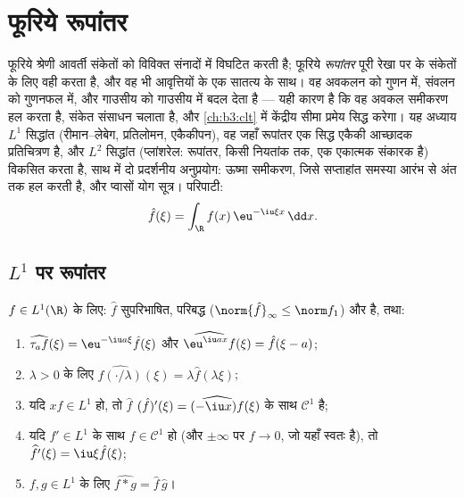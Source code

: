 \chapter{फूरिये रूपांतर}\label{ch:b3:fouriertransform}

फूरिये श्रेणी आवर्ती संकेतों को विविक्त संनादों में विघटित करती
है; फूरिये \emph{रूपांतर} पूरी रेखा पर के संकेतों के लिए वही करता
है, और वह भी आवृत्तियों के एक सातत्य के साथ। वह अवकलन को गुणन में,
संवलन को गुणनफल में, और गाउसीय को गाउसीय में बदल देता है --- यही
कारण है कि वह अवकल समीकरण हल करता है, संकेत संसाधन चलाता है, और
\cref{ch:b3:clt} में केंद्रीय सीमा प्रमेय सिद्ध करेगा। यह अध्याय $L^1$ सिद्धांत
(रीमान--लेबेग, प्रतिलोमन, एकैकीपन), वह  जहाँ रूपांतर
एक सिद्ध एकैकी आच्छादक प्रतिचित्रण है, और $L^2$ सिद्धांत (प्लांशरेल:
रूपांतर, किसी नियतांक तक, एक एकात्मक संकारक है) विकसित करता है,
साथ में दो प्रदर्शनीय अनुप्रयोग: ऊष्मा समीकरण, जिसे सप्ताहांत
समस्या आरंभ से अंत तक हल करती है, और प्वासों योग सूत्र। परिपाटी:
\[
\hat f(\xi) = \int_\R f(x)\,\eu^{-\iu\xi x}\,\dd x .
\]

\section{\texorpdfstring{$L^1$}{L1} पर रूपांतर}

\begin{proposition}\label{prop:b3:fouriertransform:basic}
$f \in L^1(\R)$ के लिए: $\hat f$ सुपरिभाषित, परिबद्ध ($\norm{\hat f}_\infty \leq \norm f_1$) और  है, तथा:
\begin{enumerate}
  \item $\widehat{\tau_af}(\xi) = \eu^{-\iu a\xi}\hat f(\xi)$ और $\widehat{\eu^{\iu ax}f}(\xi) = \hat f(\xi - a)$;
  \item $\lambda > 0$ के लिए $\widehat{f(\cdot/\lambda)}(\xi) = \lambda\hat
        f(\lambda\xi)$;
  \item यदि $xf \in L^1$ हो, तो $\hat f$ $(\hat f)'(\xi) = \widehat{(-\iu x)f}(\xi)$ के साथ $\mathcal C^1$ है;
  \item यदि $f' \in L^1$ के साथ $f \in \mathcal C^1$ हो (और $\pm\infty$ पर $f \to
        0$, जो यहाँ स्वतः
        है), तो $\widehat{f'}(\xi) = \iu\xi\hat f(\xi)$;
  \item $f, g \in L^1$ के लिए $\widehat{f * g} = \hat f\,\hat g$।
\end{enumerate}
\end{proposition}

